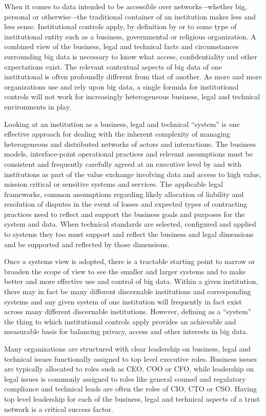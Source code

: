 When it comes to data intended to be accessible over networks–-whether big, personal or otherwise–-the traditional container of an institution makes less and less sense.
Institutional controls apply, by definition by or to some type of institutional entity such as a business, governmental or religious organization.
A combined view of the business, legal and technical facts and circumstances surrounding big data is necessary to know what access, confidentiality and other expectations exist.
The relevant contextual aspects of big data of one institutional is often profoundly different from that of another.
As more and more organizations use and rely upon big data, a single formula for institutional controls will not work for increasingly heterogeneous business, legal and technical environments in play.

Looking at an institution as a business, legal and technical “system” is one effective approach for dealing with the inherent complexity of managing heterogeneous and distributed networks of actors and interactions.
The business models, interface-point operational practices and relevant assumptions must be consistent and frequently carefully agreed at an executive level by and with institutions as part of the value exchange involving data and access to high value, mission critical or sensitive systems and services.
The applicable legal frameworks, common assumptions regarding likely allocation of liability and resolution of disputes in the event of losses and expected types of contracting practices need to reflect and support the business goals and purposes for the system and data.
When technical standards are selected, configured and applied to systems they too must support and reflect the business and legal dimensions and be supported and reflected by those dimensions.

Once a systems view is adopted, there is a tractable starting point to narrow or broaden the scope of view to see the smaller and larger systems and to make better and more effective use and control of big data.
Within a given institution, there may in fact be many different discernable institutions and corresponding systems and any given system of one institution will frequently in fact exist across many different discernable institutions. 
However, defining as a “system” the thing to which institutional controls apply provides an achievable and measurable basis for balancing privacy, access and other interests in big data.

Many organizations are structured with clear leadership on business, legal and technical issues functionally assigned to top level executive roles.  Business issues are typically allocated to roles such as CEO, COO or CFO, while leadership on legal issues is commonly assigned to roles like general counsel and regulatory compliance and technical leads are often the roles of CIO, CTO or CSO.  Having top level leadership for each of the business, legal and technical aspects of a trust network is a critical success factor. 



